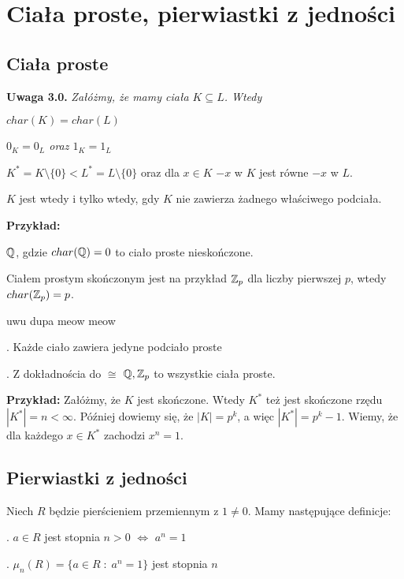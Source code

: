 
\section{Ciała proste, pierwiastki z jedności}

\subsection{Ciała proste}

\textbf{\large\color{yellow}Uwaga 3.0.}
    \emph{Załóżmy, że mamy ciała $K\subseteq L$. Wtedy}

\indent \point $char(K)=char(L)$

\indent \point \emph{$0_K=0_L$ oraz $1_K=1_L$}

\indent \point $K^*=K\setminus\{0\}<L^*=L\setminus\{0\}$ oraz dla $x\in K$ $-x$ w $K$ jest równe $-x$ w $L$.
\medskip

$K$ jest  wtedy i tylko wtedy, gdy $K$ nie zawierza żadnego właściwego podciała. 

\textbf{Przykład:}

\indent \point $\mathbb{Q}$, gdzie $char(\mathbb{Q})=0$ to ciało proste nieskończone.

\indent \point Ciałem prostym skończonym jest na przykład $\mathbb{Z}_p$ dla liczby pierwszej $p$, wtedy $char(\mathbb{Z}_p)=p$.

\begin{uwaga}{\color{back}uwu dupa meow meow}

. Każde ciało zawiera jedyne podciało proste

. Z dokładnościa do $\cong$ $\mathbb{Q},\mathbb{Z}_p$ to wszystkie ciała proste.
\end{uwaga}

\textbf{Przykład:} Załóżmy, że $K$ jest skończone. Wtedy $K^*$ też jest skończone rzędu $|K^*|=n<\infty$. Później dowiemy się, że $|K|=p^k$, a więc $|K^*|=p^k-1$. Wiemy, że dla każdego $x\in K^*$ zachodzi $x^n=1$.

\subsection{Pierwiastki z jedności}

Niech $R$ będzie pierścieniem przemiennym z $1\neq0$. Mamy następujące definicje:

. $a\in R$ jest stopnia $n>0$ $\iff$ $a^n=1$

. $\mu_n(R)=\{a\in R\;:\;a^n=1\}$ jest  stopnia $n$

